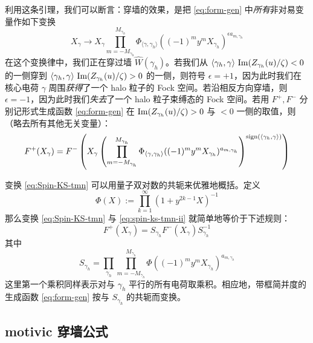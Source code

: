 利用这条引理，我们可以断言：穿墙的效果，是把 \eqref{eq:form-gen} 中\emph{所有}非对易变量作如下变换
\begin{equation}\label{eq:Spin-KS-tmn}
X_\gamma \to X_\gamma \prod_{m=-M_{\gamma_h}}^{M_{\gamma_h}}
\Phi_{\langle \gamma, \gamma_h\rangle} ( (-1)^m y^m
X_{\gamma_h})^{\epsilon a_{m,\gamma_h}}
\end{equation}
在这个变换律中，我们正在穿过墙 $\widehat{W}(\gamma_h)$。若我们从 $\langle \gamma_h, \gamma \rangle \ {\rm Im}(Z_{\gamma_h}(u)/\zeta) < 0$ 的一侧穿到 $\langle \gamma_h, \gamma \rangle \ {\rm Im}(Z_{\gamma_h}(u)/\zeta) > 0$ 的一侧，则符号 $\epsilon=+1$，因为此时我们在核心电荷 $\gamma$ 周围\emph{获得}了一个 halo 粒子的 Fock 空间。若沿相反方向穿墙，则 $\epsilon=-1$，因为此时我们\emph{失去}了一个 halo 粒子束缚态的 Fock 空间。若用 $F^+, F^-$ 分别记形式生成函数 \eqref{eq:form-gen} 在 ${\rm Im}(Z_{\gamma_h}(u)/\zeta) > 0$ 与 $<0$ 一侧的取值，则（略去所有其他无关变量）：
\begin{equation}\label{eq:spin-ks-tmn-ii}
F^+(X_\gamma) = F^-\left( X_\gamma \left( \prod_{m=-M_{\gamma_h}}^{M_{\gamma_h}}
\Phi_{\langle \gamma, \gamma_h\rangle} ( (-1)^m y^m
X_{\gamma_h})^{a_{m,\gamma_h}}\right)^{{\rm sign}(\langle \gamma_h,
\gamma\rangle ) }\right)
\end{equation}

变换 \eqref{eq:Spin-KS-tmn} 可以用量子双对数的共轭来优雅地概括。定义
\begin{equation}
\Phi(X) := \prod_{k=1}^\infty ( 1 + y^{2k-1} X)^{-1}
\end{equation}
那么变换 \eqref{eq:Spin-KS-tmn} 与 \eqref{eq:spin-ks-tmn-ii} 就简单地等价于下述规则：
\begin{equation}\label{eq:Spin-KS-tmn-S}
F^+(X_\gamma) =   S_{\gamma_h} F^-(X_\gamma ) S_{\gamma_h}^{-1}
\end{equation}
其中
\begin{equation}\label{eq:Spin-KS-ii}
S_{\gamma_h} =  \prod_{\gamma_h} \prod_{m=-M_{\gamma_h}}^{M_{\gamma_h}} \Phi (
(-1)^m y^m X_{\gamma_h})^{a_{m,\gamma_h}}
\end{equation}
这里第一个乘积同样表示对与 $\gamma_h$ 平行的所有电荷取乘积。相应地，带框简并度的生成函数 \eqref{eq:form-gen} 按与 $S_{\gamma_h}$ 的共轭而变换。

\subsection{motivic 穿墙公式}\label{subsec:Motivic-WCF}

